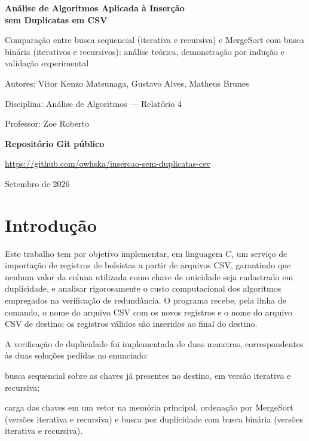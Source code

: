 \documentclass[11pt,a4paper]{article}
\newcommand{\repositorio}{https://github.com/owhska/insercao-sem-duplicatas-csv}
\begin{document}
\begin{titlepage}
\centering
\vspace*{3cm}
{\LARGE\bfseries Análise de Algoritmos Aplicada à Inserção\\[0.3em] sem Duplicatas em CSV\par}
\vspace{0.8cm}
{\large Comparação entre busca sequencial (iterativa e recursiva) e MergeSort com busca binária (iterativos e recursivos): análise teórica, demonstração por indução e validação experimental\par}
\vspace{3cm}
{\large Autores: Vitor Kenzo Matsunaga, Gustavo Alves, Matheus Brunes\par}
\vspace{0.4cm}
{\large Disciplina: Análise de Algoritmos --- Relatório 4\par}
\vspace{0.4cm}
{\large Professor: Zoe Roberto\par}
\vspace{2cm}
{\bfseries Repositório Git público\par}
\vspace{0.2cm}
{\ttfamily\small \url{\repositorio}\par}
\vfill
{Setembro de 2026\par}
\end{titlepage}

\tableofcontents
\newpage

\section{Introdução}

Este trabalho tem por objetivo implementar, em linguagem C, um serviço de importação de registros de bolsistas a partir de arquivos CSV, garantindo que nenhum valor da coluna utilizada como chave de unicidade seja cadastrado em duplicidade, e analisar rigorosamente o custo computacional dos algoritmos empregados na verificação de redundância. O programa recebe, pela linha de comando, o nome do arquivo CSV com os novos registros e o nome do arquivo CSV de destino; os registros válidos são inseridos ao final do destino.

A verificação de duplicidade foi implementada de duas maneiras, correspondentes às duas soluções pedidas no enunciado:

\begin{description}[leftmargin=1.2cm,style=nextline]
  \item[Solução 1] busca sequencial sobre as chaves já presentes no destino, em versão iterativa e recursiva;
  \item[Solução 2] carga das chaves em um vetor na memória principal, ordenação por MergeSort (versões iterativa e recursiva) e busca por duplicidade com busca binária (versões iterativa e recursiva).
\end{description}
\end{document}
